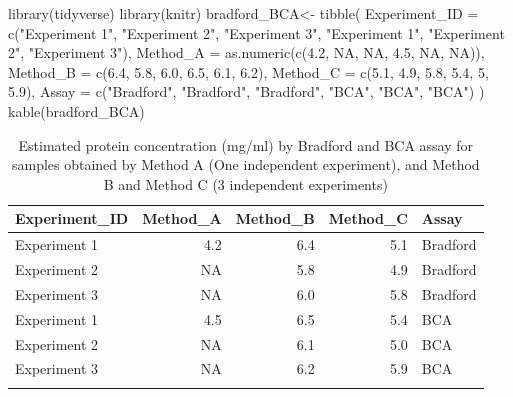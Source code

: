 \documentclass[
  letterpaper,
  DIV=11,
  numbers=noendperiod]{scrreprt}
\newenvironment{Shaded}{\begin{snugshade}}{\end{snugshade}}
\newcommand{\AttributeTok}[1]{\textcolor[rgb]{0.40,0.45,0.13}{#1}}
\newcommand{\ConstantTok}[1]{\textcolor[rgb]{0.56,0.35,0.01}{#1}}
\newcommand{\DecValTok}[1]{\textcolor[rgb]{0.68,0.00,0.00}{#1}}
\newcommand{\FloatTok}[1]{\textcolor[rgb]{0.68,0.00,0.00}{#1}}
\newcommand{\FunctionTok}[1]{\textcolor[rgb]{0.28,0.35,0.67}{#1}}
\newcommand{\NormalTok}[1]{\textcolor[rgb]{0.00,0.23,0.31}{#1}}
\newcommand{\OtherTok}[1]{\textcolor[rgb]{0.00,0.23,0.31}{#1}}
\newcommand{\StringTok}[1]{\textcolor[rgb]{0.13,0.47,0.30}{#1}}
\begin{document}
\begin{Shaded}
\begin{Highlighting}[]
\FunctionTok{library}\NormalTok{(tidyverse)}
\FunctionTok{library}\NormalTok{(knitr)}
\NormalTok{bradford\_BCA}\OtherTok{\textless{}{-}} \FunctionTok{tibble}\NormalTok{(}
  \AttributeTok{Experiment\_ID =} \FunctionTok{c}\NormalTok{(}\StringTok{"Experiment 1"}\NormalTok{, }\StringTok{"Experiment 2"}\NormalTok{, }\StringTok{"Experiment 3"}\NormalTok{, }
                    \StringTok{"Experiment 1"}\NormalTok{, }\StringTok{"Experiment 2"}\NormalTok{, }\StringTok{"Experiment 3"}\NormalTok{),}
  \AttributeTok{Method\_A =} \FunctionTok{as.numeric}\NormalTok{(}\FunctionTok{c}\NormalTok{(}\FloatTok{4.2}\NormalTok{, }\ConstantTok{NA}\NormalTok{, }\ConstantTok{NA}\NormalTok{, }\FloatTok{4.5}\NormalTok{, }\ConstantTok{NA}\NormalTok{, }\ConstantTok{NA}\NormalTok{)),}
  \AttributeTok{Method\_B =} \FunctionTok{c}\NormalTok{(}\FloatTok{6.4}\NormalTok{, }\FloatTok{5.8}\NormalTok{, }\FloatTok{6.0}\NormalTok{, }\FloatTok{6.5}\NormalTok{, }\FloatTok{6.1}\NormalTok{, }\FloatTok{6.2}\NormalTok{),}
  \AttributeTok{Method\_C =} \FunctionTok{c}\NormalTok{(}\FloatTok{5.1}\NormalTok{, }\FloatTok{4.9}\NormalTok{, }\FloatTok{5.8}\NormalTok{, }\FloatTok{5.4}\NormalTok{, }\DecValTok{5}\NormalTok{, }\FloatTok{5.9}\NormalTok{),}
  \AttributeTok{Assay =} \FunctionTok{c}\NormalTok{(}\StringTok{"Bradford"}\NormalTok{, }\StringTok{"Bradford"}\NormalTok{, }\StringTok{"Bradford"}\NormalTok{, }\StringTok{"BCA"}\NormalTok{, }\StringTok{"BCA"}\NormalTok{, }\StringTok{"BCA"}\NormalTok{)}
\NormalTok{)}
\FunctionTok{kable}\NormalTok{(bradford\_BCA)}
\end{Highlighting}
\end{Shaded}

\begin{longtable}[]{@{}lrrrl@{}}

\toprule\noalign{}
Experiment\_ID & Method\_A & Method\_B & Method\_C & Assay \\
\midrule\noalign{}
\endhead
\bottomrule\noalign{}
\endlastfoot
Experiment 1 & 4.2 & 6.4 & 5.1 & Bradford \\
Experiment 2 & NA & 5.8 & 4.9 & Bradford \\
Experiment 3 & NA & 6.0 & 5.8 & Bradford \\
Experiment 1 & 4.5 & 6.5 & 5.4 & BCA \\
Experiment 2 & NA & 6.1 & 5.0 & BCA \\
Experiment 3 & NA & 6.2 & 5.9 & BCA \\

\caption{\label{tbl-proteinestimate}Estimated protein concentration
(mg/ml) by Bradford and BCA assay for samples obtained by Method A (One
independent experiment), and Method B and Method C (3 independent
experiments)}

\tabularnewline

\end{longtable}
\end{document}
